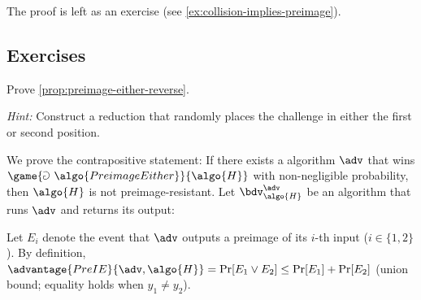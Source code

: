 The proof is left as an exercise (see \autoref{ex:collision-implies-preimage}).

\subsection{Exercises}

\begin{exercise}\label{ex:preimage-either-reverse}
  Prove \autoref{prop:preimage-either-reverse}.
  
  \emph{Hint:} Construct a reduction that randomly places the challenge in either the first or second position.
\end{exercise}

\ifsolutions
\begin{mysolution}
  We prove the contrapositive statement:
  If there exists a \ppt algorithm $\adv$ that wins $\game{\Game~\algo{PreimageEither}}{\algo{H}}$ with non-negligible probability, then $\algo{H}$ is not preimage-resistant.
  Let $\bdv^\adv_\algo{H}$ be an algorithm that runs $\adv$ and returns its output:

  \begin{center}
    \begin{tcolorbox}[width=6cm]
      \begin{pchstack}[center]
      \end{pchstack}
    \end{tcolorbox}
  \end{center}
  
  Let $E_i$ denote the event that $\adv$ outputs a preimage of its $i$-th input ($i \in \{1, 2\}$).
  By definition, $\advantage{PreIE}{\adv, \algo{H}} = \Pr[E_1 \vee E_2] \leq \Pr[E_1] + \Pr[E_2]$ (union bound; equality holds when $y_1 \neq y_2$).
  

\end{mysolution}
